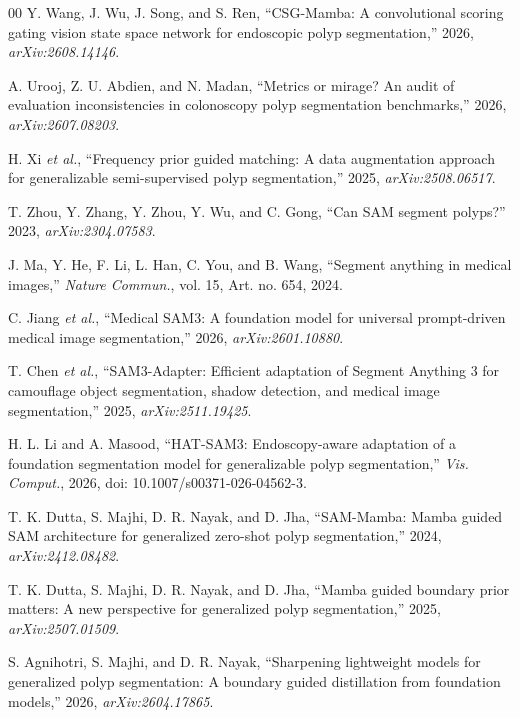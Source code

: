 \documentclass{ieeeaccess}
\begin{document}
\begin{thebibliography}{00}
 Y. Wang, J. Wu, J. Song, and S. Ren, ``CSG-Mamba: A convolutional scoring gating vision state space network for endoscopic polyp segmentation,'' 2026, \emph{arXiv:2608.14146}.


 A. Urooj, Z. U. Abdien, and N. Madan, ``Metrics or mirage? An audit of evaluation inconsistencies in colonoscopy polyp segmentation benchmarks,'' 2026, \emph{arXiv:2607.08203}.


 H. Xi \emph{et al.}, ``Frequency prior guided matching: A data augmentation approach for generalizable semi-supervised polyp segmentation,'' 2025, \emph{arXiv:2508.06517}.


 T. Zhou, Y. Zhang, Y. Zhou, Y. Wu, and C. Gong, ``Can SAM segment polyps?'' 2023, \emph{arXiv:2304.07583}.


 J. Ma, Y. He, F. Li, L. Han, C. You, and B. Wang, ``Segment anything in medical images,'' \emph{Nature Commun.}, vol. 15, Art. no. 654, 2024.


 C. Jiang \emph{et al.}, ``Medical SAM3: A foundation model for universal prompt-driven medical image segmentation,'' 2026, \emph{arXiv:2601.10880}.


 T. Chen \emph{et al.}, ``SAM3-Adapter: Efficient adaptation of Segment Anything 3 for camouflage object segmentation, shadow detection, and medical image segmentation,'' 2025, \emph{arXiv:2511.19425}.


 H. L. Li and A. Masood, ``HAT-SAM3: Endoscopy-aware adaptation of a foundation segmentation model for generalizable polyp segmentation,'' \emph{Vis. Comput.}, 2026, doi: 10.1007/s00371-026-04562-3.


 T. K. Dutta, S. Majhi, D. R. Nayak, and D. Jha, ``SAM-Mamba: Mamba guided SAM architecture for generalized zero-shot polyp segmentation,'' 2024, \emph{arXiv:2412.08482}.


 T. K. Dutta, S. Majhi, D. R. Nayak, and D. Jha, ``Mamba guided boundary prior matters: A new perspective for generalized polyp segmentation,'' 2025, \emph{arXiv:2507.01509}.


 S. Agnihotri, S. Majhi, and D. R. Nayak, ``Sharpening lightweight models for generalized polyp segmentation: A boundary guided distillation from foundation models,'' 2026, \emph{arXiv:2604.17865}.



\end{thebibliography}
\end{document}
